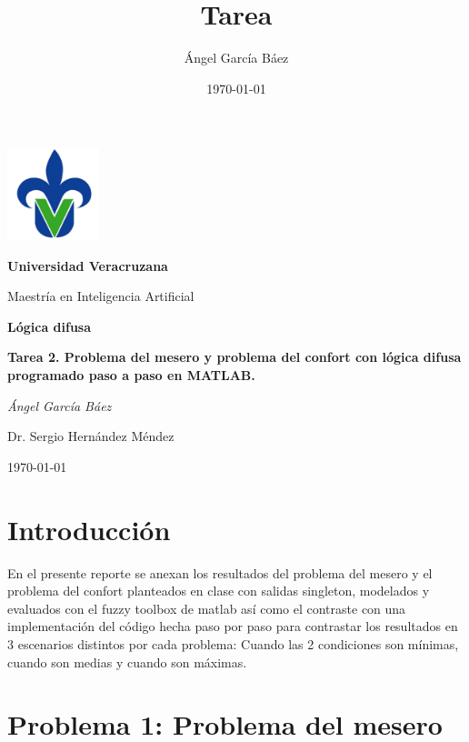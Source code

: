 \documentclass[11pt, letterpaper]{article}
\title{\bfseries Tarea}
\author{Ángel García Báez}
\date{\today}
\begin{document}
	
	\begin{titlepage}
		\centering
		\includegraphics[width=0.2\textwidth]{logo.png}\par
		\vspace{1cm}
		{\LARGE \bfseries Universidad Veracruzana \par}
		\vspace{1cm}
		{\Large Maestría en Inteligencia Artificial\par}
		\vspace{3cm}
		{\LARGE \bfseries Lógica difusa \par}
		\vspace{1cm}
		{\Large \bfseries Tarea 2. Problema del mesero y problema del confort con lógica difusa programado paso a paso en MATLAB. \par}
		\vfill
		{\Large \textit{Ángel García Báez}\par}
		\vfill
		{\Large Dr. Sergio Hernández Méndez \par}
		\vfill
		{\Large \today \par}
	\end{titlepage}
	
	\newpage
	\tableofcontents
	\newpage
	

\section{Introducción}

En el presente reporte se anexan los resultados del problema del mesero y el problema del confort planteados en clase con salidas singleton, modelados y evaluados con el fuzzy toolbox de matlab así como el contraste con una implementación del código hecha paso por paso para contrastar los resultados en 3 escenarios distintos por cada problema: Cuando las 2 condiciones son mínimas, cuando son medias y cuando son máximas.

\newpage


\section{Problema 1: Problema del mesero}
\end{document}
